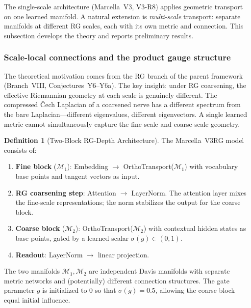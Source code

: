 \documentclass[11pt,a4paper]{article}
\theoremstyle{definition}
\newtheorem{definition}[theorem]{Definition}
\theoremstyle{remark}
\begin{document}
The single-scale architecture (Marcella~V3, V3-R8) applies 
geometric transport on one learned manifold. A natural extension 
is \emph{multi-scale} transport: separate manifolds at different 
RG scales, each with its own metric and connection. This subsection 
develops the theory and reports preliminary results.

\subsubsection{Scale-local connections and the product gauge 
structure}

The theoretical motivation comes from the RG branch of the parent 
framework (Branch~VIII, Conjectures~Y6--Y6a). The key insight: 
under RG coarsening, the effective Riemannian geometry at each 
scale is genuinely different. The compressed \v{C}ech Laplacian of 
a coarsened nerve has a different spectrum from the bare 
Laplacian---different eigenvalues, different eigenvectors. A 
single learned metric cannot simultaneously capture the fine-scale 
and coarse-scale geometry.

\begin{definition}[Two-Block RG-Depth 
Architecture]\label{def:v3rg}
The Marcella~V3RG model consists of:
\begin{enumerate}[nosep]
    \item \textbf{Fine block} ($\mathcal{M}_1$): Embedding 
    $\to$ OrthoTransport($\mathcal{M}_1$) with vocabulary base 
    points and tangent vectors as input.
    \item \textbf{RG coarsening step}: Attention $\to$ LayerNorm. 
    The attention layer mixes the fine-scale representations; the 
    norm stabilizes the output for the coarse block.
    \item \textbf{Coarse block} ($\mathcal{M}_2$): 
    OrthoTransport($\mathcal{M}_2$) with contextual hidden states 
    as base points, gated by a learned scalar 
    $\sigma(g) \in (0, 1)$.
    \item \textbf{Readout}: LayerNorm $\to$ linear projection.
\end{enumerate}
The two manifolds $\mathcal{M}_1, \mathcal{M}_2$ are independent 
Davis manifolds with separate metric networks and (potentially) 
different connection structures. The gate parameter $g$ is 
initialized to $0$ so that $\sigma(g) = 0.5$, allowing the coarse 
block equal initial influence.
\end{definition}
\end{document}
